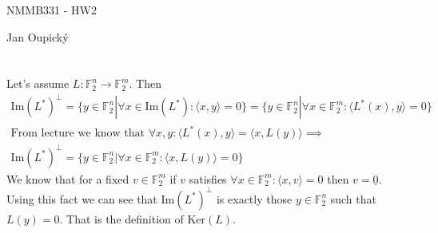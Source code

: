 \documentclass[12pt, a4paper]{article}
\begin{document}
\begin{center}
\large NMMB331 - HW2

\normalsize Jan Oupický
\end{center}
\vspace{1\baselineskip}

\section{}
Let's assume $L: \mathbb{F}_2^n \rightarrow \mathbb{F}_2^m$. Then
\begin{gather*}
\text{Im}(L^*)^\perp = \{y \in \mathbb{F}_2^n | \forall x \in \text{Im}(L^*) : \langle x,y \rangle = 0\} = \{y \in \mathbb{F}_2^n | \forall x \in \mathbb{F}_2^m : \langle L^*(x),y \rangle = 0\}\\
\text{From lecture we know that $\forall x,y:  \langle L^*(x),y \rangle =  \langle x,L(y) \rangle$} \implies\\
\text{Im}(L^*)^\perp = \{y \in \mathbb{F}_2^n | \forall x \in \mathbb{F}_2^m : \langle x,L(y) \rangle = 0\}
\end{gather*}
We know that for a fixed $v \in \mathbb{F}_2^m$ if $v$ satisfies $\forall x \in \mathbb{F}_2^m: \langle x,v \rangle = 0$ then $v = \underline{0}$. Using this fact we can see that $\text{Im}(L^*)^\perp$ is exactly those $y \in \mathbb{F}_2^n$ such that $L(y) = 0$. That is the definition of $\text{Ker}(L)$.
\end{document}
